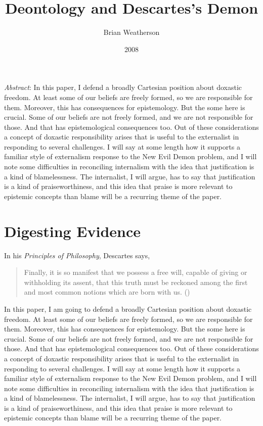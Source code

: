 \documentclass[
  11pt,
  letterpaper,
  DIV=11,
  numbers=noendperiod,
  twoside]{scrartcl}
\title{Deontology and Descartes's Demon}
\author{Brian Weatherson}
\date{2008}
\renewenvironment{abstract}
 {\vspace{-1.25cm}
 \quotation\small\noindent\emph{Abstract}:}
 {\endquotation}
\renewenvironment{abstract}
 {\quotation\small\noindent\emph{Abstract}:}
 {\endquotation\vspace{-0.02cm}}
\begin{document}
\maketitle
\begin{abstract}
In this paper, I defend a broadly Cartesian position about doxastic
freedom. At least some of our beliefs are freely formed, so we are
responsible for them. Moreover, this has consequences for epistemology.
But the some here is crucial. Some of our beliefs are not freely formed,
and we are not responsible for those. And that has epistemological
consequences too. Out of these considerations a concept of doxastic
responsibility arises that is useful to the externalist in responding to
several challenges. I will say at some length how it supports a familiar
style of externalism response to the New Evil Demon problem, and I will
note some difficulties in reconciling internalism with the idea that
justification is a kind of blamelessness. The internalist, I will argue,
has to say that justification is a kind of praiseworthiness, and this
idea that praise is more relevant to epistemic concepts than blame will
be a recurring theme of the paper.
\end{abstract}


\section{Digesting Evidence}\label{digesting-evidence}

In his \emph{Principles of Philosophy}, Descartes says,

\begin{quote}
Finally, it is so manifest that we possess a free will, capable of
giving or withholding its assent, that this truth must be reckoned among
the first and most common notions which are born with us.
()
\end{quote}

In this paper, I am going to defend a broadly Cartesian position about
doxastic freedom. At least some of our beliefs are freely formed, so we
are responsible for them. Moreover, this has consequences for
epistemology. But the some here is crucial. Some of our beliefs are not
freely formed, and we are not responsible for those. And that has
epistemological consequences too. Out of these considerations a concept
of doxastic responsibility arises that is useful to the externalist in
responding to several challenges. I will say at some length how it
supports a familiar style of externalism response to the New Evil Demon
problem, and I will note some difficulties in reconciling internalism
with the idea that justification is a kind of blamelessness. The
internalist, I will argue, has to say that justification is a kind of
praiseworthiness, and this idea that praise is more relevant to
epistemic concepts than blame will be a recurring theme of the paper.
\end{document}
